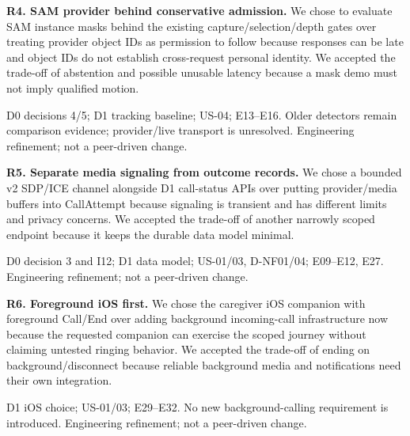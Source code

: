 \documentclass[12pt,letterpaper]{article}
\begin{document}
\begin{minipage}{\linewidth}
\textbf{R4. SAM provider behind conservative admission.} We chose to evaluate SAM instance masks behind the existing capture/selection/depth gates over treating provider object IDs as permission to follow because responses can be late and object IDs do not establish cross-request personal identity. We accepted the trade-off of abstention and possible unusable latency because a mask demo must not imply qualified motion.

{\small D0 decisions 4/5; D1 tracking baseline; US-04; E13--E16. Older detectors remain comparison evidence; provider/live transport is unresolved. Engineering refinement; not a peer-driven change.\par}
\end{minipage}\par\medskip

\begin{minipage}{\linewidth}
\textbf{R5. Separate media signaling from outcome records.} We chose a bounded v2 SDP/ICE channel alongside D1 call-status APIs over putting provider/media buffers into CallAttempt because signaling is transient and has different limits and privacy concerns. We accepted the trade-off of another narrowly scoped endpoint because it keeps the durable data model minimal.

{\small D0 decision 3 and I12; D1 data model; US-01/03, D-NF01/04; E09--E12, E27. Engineering refinement; not a peer-driven change.\par}
\end{minipage}\par\medskip

\begin{minipage}{\linewidth}
\textbf{R6. Foreground iOS first.} We chose the caregiver iOS companion with foreground Call/End over adding background incoming-call infrastructure now because the requested companion can exercise the scoped journey without claiming untested ringing behavior. We accepted the trade-off of ending on background/disconnect because reliable background media and notifications need their own integration.

{\small D1 iOS choice; US-01/03; E29--E32. No new background-calling requirement is introduced. Engineering refinement; not a peer-driven change.\par}
\end{minipage}\par\medskip
\end{document}
